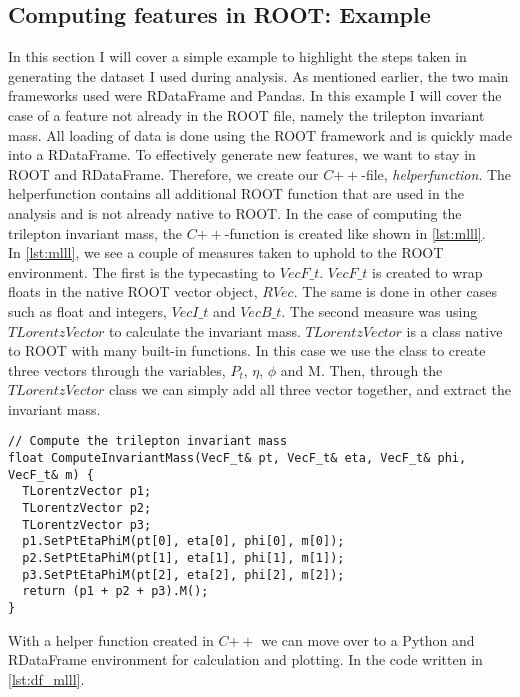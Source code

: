 \subsection{Computing features in ROOT: Example}
In this section I will cover a simple example to highlight the steps taken in generating the dataset 
I used during analysis. As mentioned earlier, the two main frameworks used were RDataFrame and Pandas. 
In this example I will cover the case of a feature not already in the ROOT file, namely the trilepton
invariant mass. All loading of data is done using the ROOT framework and is quickly made into a 
RDataFrame. To effectively generate new features, we want to stay in ROOT and RDataFrame. Therefore,
we create our $C{++}$-file, \emph{helperfunction}. The helperfunction contains all additional 
ROOT function that are used in the analysis and is not already native to ROOT. In the case 
of computing the trilepton invariant mass, the $C{++}$-function is created like shown in 
\ref{lst:mlll}.
\\
In \ref{lst:mlll}, we see a couple of measures taken to uphold to the ROOT environment. The first is 
the typecasting to $VecF\_t$. $VecF\_t$ is created to wrap floats in the native ROOT vector object, $RVec$. 
The same is done in other cases such as float and integers, $VecI\_t$ and $VecB\_t$. The second measure
was using $TLorentzVector$ \cite{TLorentzVector} to calculate the invariant mass. $TLorentzVector$ is a class
native to ROOT with many built-in functions. In this case we use the class to create three vectors through the 
variables, $P_t$, $\eta$, $\phi$ and M. Then, through the $TLorentzVector$ class we can simply
add all three vector together, and extract the invariant mass. 
\lstset{style=Cpp}
\begin{lstlisting}[caption={$C{++}$-function for $M_{lll}$.},captionpos=b, label={lst:mlll}]
// Compute the trilepton invariant mass 
float ComputeInvariantMass(VecF_t& pt, VecF_t& eta, VecF_t& phi, VecF_t& m) {
  TLorentzVector p1;
  TLorentzVector p2;
  TLorentzVector p3;
  p1.SetPtEtaPhiM(pt[0], eta[0], phi[0], m[0]);
  p2.SetPtEtaPhiM(pt[1], eta[1], phi[1], m[1]);
  p3.SetPtEtaPhiM(pt[2], eta[2], phi[2], m[2]);
  return (p1 + p2 + p3).M();
}
\end{lstlisting}
With a helper function created in $C{++}$ we can move over to a Python and RDataFrame environment
for calculation and plotting. In the code written in \ref{lst:df_mlll}.

